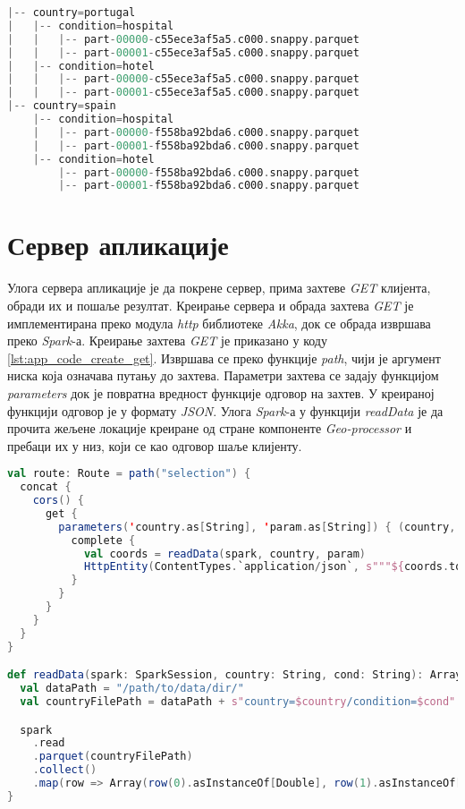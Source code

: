 \documentclass[12pt,oneside]{memoir}
\begin{document}
\begin{lstlisting}[caption={Структура директоријума партиционисаног по државама и врстама локација}, language=Scala, label={lst:app_code_partition_by_countries}]
|-- country=portugal
|   |-- condition=hospital
|   |   |-- part-00000-c55ece3af5a5.c000.snappy.parquet
|   |   |-- part-00001-c55ece3af5a5.c000.snappy.parquet
|   |-- condition=hotel
|   |   |-- part-00000-c55ece3af5a5.c000.snappy.parquet
|   |   |-- part-00001-c55ece3af5a5.c000.snappy.parquet
|-- country=spain
    |-- condition=hospital
    |   |-- part-00000-f558ba92bda6.c000.snappy.parquet
    |   |-- part-00001-f558ba92bda6.c000.snappy.parquet
    |-- condition=hotel
        |-- part-00000-f558ba92bda6.c000.snappy.parquet
        |-- part-00001-f558ba92bda6.c000.snappy.parquet
\end{lstlisting}

\section{Сервер апликације}
\label{sec:app_server}

Улога сервера апликације је да покрене сервер, прима захтеве \textit{GET} клијента, обради их и пошаље резултат. Креирање сервера и обрада захтева \textit{GET} је имплементирана преко модула \textit{http} библиотеке \textit{Akka}, док се обрада извршава преко \textit{Spark}-а. Креирање захтева \textit{GET} је приказано у коду \ref{lst:app_code_create_get}. Извршава се преко функције \textit{path}, чији је аргумент ниска која означава путању до захтева. Параметри захтева се задају функцијом \textit{parameters} док је повратна вредност функције одговор на захтев. У креираној функцији одговор је у формату \textit{JSON}. Улога \textit{Spark}-а у функцији \textit{readData} је да прочита жељене локације креиране од стране компоненте \textit{Geo-processor} и пребаци их у низ, који се као одговор шаље клијенту.

\begin{lstlisting}[caption={Имплементација функције која прима и обрађује захтев \textit{GET}}, language=Scala, label={lst:app_code_create_get}]
val route: Route = path("selection") {
  concat {
    cors() {
      get {
        parameters('country.as[String], 'param.as[String]) { (country, param) =>
          complete {
            val coords = readData(spark, country, param)
            HttpEntity(ContentTypes.`application/json`, s"""${coords.toJson}""")
          }
        }
      }
    }
  }
}

def readData(spark: SparkSession, country: String, cond: String): Array[Array[Double]] = {
  val dataPath = "/path/to/data/dir/"
  val countryFilePath = dataPath + s"country=$country/condition=$cond"

  spark
    .read
    .parquet(countryFilePath)
    .collect()
    .map(row => Array(row(0).asInstanceOf[Double], row(1).asInstanceOf[Double]))
}
\end{lstlisting}
\end{document}
